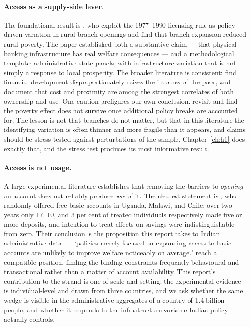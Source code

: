 \paragraph{Access as a supply-side lever.} The foundational result is \citet{burgess2005}, who
exploit the 1977--1990 licensing rule as policy-driven variation in rural branch openings and find
that branch expansion reduced rural poverty. The paper established both a substantive claim ---
that physical banking infrastructure has real welfare consequences --- and a methodological
template: administrative state panels, with infrastructure variation that is not simply a response
to local prosperity. The broader literature is consistent: \citet{beck2007} find financial
development disproportionately raises the incomes of the poor, and \citet{allen2016} document that
cost and proximity are among the strongest correlates of both ownership and use. One caution
prefigures our own conclusion. \citet{buliskeria2022} revisit \citet{burgess2005} and find the
poverty effect does not survive once additional policy breaks are accounted for. The lesson is not
that branches do not matter, but that in this literature the identifying variation is often thinner
and more fragile than it appears, and claims should be stress-tested against perturbations of the
sample. Chapter~\ref{ch:h1} does exactly that, and the stress test produces its most informative
result.

\paragraph{Access is not usage.} A large experimental literature establishes that removing the
barriers to \emph{opening} an account does not reliably produce \emph{use} of it. The clearest
statement is \citet{dupas2018}, who randomly offered free basic accounts in Uganda, Malawi, and
Chile: over two years only 17, 10, and 3 per cent of treated individuals respectively made five or
more deposits, and intention-to-treat effects on savings were indistinguishable from zero. Their
conclusion is the proposition this report takes to Indian administrative data --- ``policies merely
focused on expanding access to basic accounts are unlikely to improve welfare noticeably on
average.'' \citet{karlan2014} reach a compatible position, finding the binding constraints
frequently behavioural and transactional rather than a matter of account availability. This
report's contribution to the strand is one of scale and setting: the experimental evidence is
individual-level and drawn from three countries, and we ask whether the same wedge is visible in
the administrative aggregates of a country of 1.4 billion people, and whether it responds to the
infrastructure variable Indian policy actually controls.

